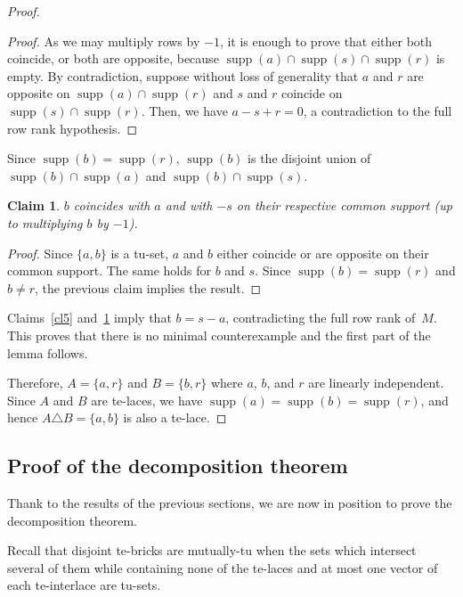 \documentclass[11pt,a4paper]{amsart}
\theoremstyle{plain}
\newtheorem{claimnumb}{Claim}[theorem]{\itshape}{\rmfamily}
\theoremstyle{definition}
\DeclareMathOperator{\supp}{supp}
\begin{document}
\begin{proof}
\begin{proof}
As we may multiply rows by $-1$, it is enough to prove that either both coincide, or both are opposite, because $\supp(a)\cap \supp(s)\cap \supp(r)$ is empty.
By contradiction, suppose without loss of generality that $a$ and $r$ are opposite on $\supp(a)\cap \supp(r)$ and $s$ and $r$ coincide on $\supp(s)\cap \supp(r)$.
Then, we have $a-s+r=0$, a contradiction to the full row rank hypothesis.
\end{proof}

Since $\supp(b)=\supp(r)$, $\supp(b)$ is the disjoint union of $\supp(b)\cap\supp(a)$ and $\supp(b)\cap\supp(s)$.

\begin{claimnumb}\label{cl6}
$b$ coincides with $a$ and with $-s$ on their respective common support (up to multiplying $b$ by $-1$).
\end{claimnumb}
\begin{proof}
Since $\{a,b\}$ is a tu-set, $a$ and $b$ either coincide or are opposite on their common support.
The same holds for $b$ and $s$.
Since $\supp(b)=\supp(r)$ and $b\neq r$, the previous claim implies the result.
\end{proof}

Claims~\ref{cl5} and~\ref{cl6} imply that $b = s-a$, contradicting the full row rank of~$M$.
This proves that there is no minimal counterexample and the first part of the lemma follows.
\medskip

Therefore, $A=\{a,r\}$ and $B=\{b,r\}$ where $a$, $b$, and $r$ are linearly independent.
Since $A$ and $B$ are te-laces, we have $\supp(a)=\supp(b)=\supp(r)$, and hence $A\triangle B = \{a,b\}$ is also a te-lace.
\end{proof}


\subsection{Proof of the decomposition theorem}
Thank to the results of the previous sections, we are now in position to prove the decomposition theorem.

Recall that disjoint te-bricks are mutually-tu when the sets which intersect several of them while containing none of the te-laces and at most one vector of each te-interlace are tu-sets.
\end{document}

